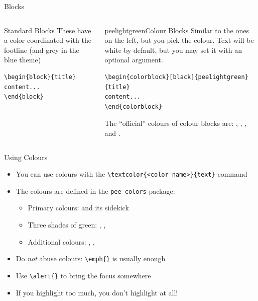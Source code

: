 \begin{frame}[fragile]{Blocks}
\begin{columns} %
\begin{column}{0.3\textwidth}
\begin{block}{Standard Blocks}
These have a color coordinated with the footline (and grey in the blue theme)
\begin{verbatim}
\begin{block}{title}
content...
\end{block}
\end{verbatim}
\end{block}
\end{column}
\begin{column}{0.7\textwidth}
\begin{colorblock}[black]{peelightgreen}{Colour Blocks}
Similar to the ones on the left, but you pick the colour. Text will be white by default, but you may set it with an optional argument.
\small
\begin{verbatim}
\begin{colorblock}[black]{peelightgreen}{title}
content...
\end{colorblock}
\end{verbatim}
\end{colorblock}
The ``official'' colours of colour blocks are: , 
, , and 
.
\end{column}
\end{columns}
\end{frame}


\footlinecolor{}
\begin{frame}[fragile]{Using Colours}
\begin{itemize}[<alert@2>]
  \item You can use colours with the
        \verb|\textcolor{<color name>}{text}| command
  \item The colours are defined in the \texttt{pee\_colors} package:
  \begin{itemize}
  \item Primary colours:  and its sidekick 
  \item Three shades of green: , 
  , 
  \item Additional colours: , , 
  \end{itemize}
  \item Do \emph{not} abuse colours: \verb|\emph{}| is usually enough
  \item Use \verb|\alert{}| to bring the \alert<2->{focus} somewhere
  \item <2- | alert@2> If you highlight too much, you don't highlight at all!
\end{itemize}
\end{frame}

